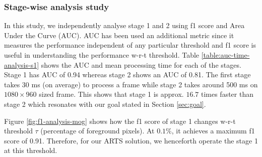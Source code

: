 \vspace{5pt}
\subsubsection{Stage-wise analysis study}
In this study, we independently analyse stage 1 and 2 using f1 score and Area Under the Curve (AUC). AUC has been used an additional metric since it measures the performance independent of any particular threshold and f1 score is useful in understanding the performance w-r-t threshold.  
Table \ref{table:auc-time-analysis-s1} shows the AUC and mean processing time for each of the stages. Stage 1 has AUC of 0.94 whereas stage 2 shows an AUC of 0.81. The first stage takes 30 ms  (on average) to process a frame while stage 2 takes around 500 ms on $1080 \times 960$ sized frame. This shows that stage 1 is approx. $16.7$ times faster than stage 2 which resonates with our goal stated in Section \ref{sec:goal}. 

Figure \ref{fig:f1-analysis-mog} shows how the f1 score of stage 1 changes w-r-t threshold $\tau$ (percentage of foreground pixels). At $0.1\%$, it achieves a maximum f1 score of 0.91. Therefore, for our ARTS solution, we henceforth operate the stage 1 at this threshold.

